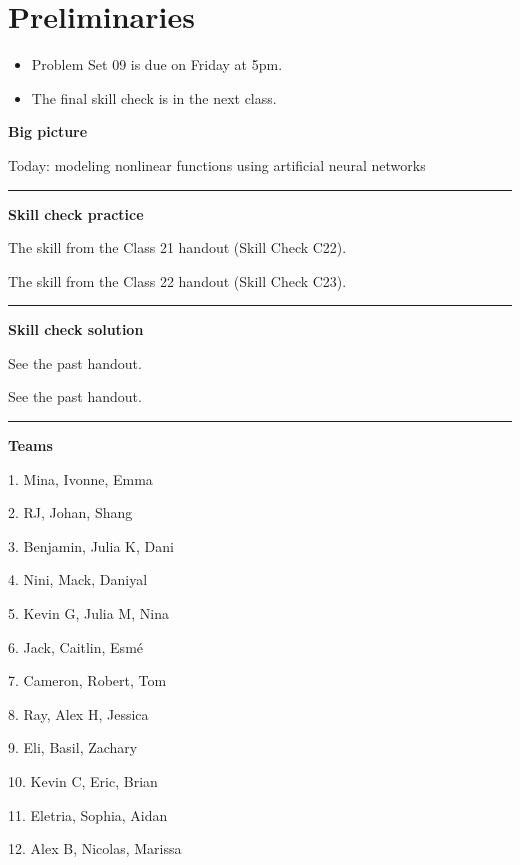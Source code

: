 \documentclass[12pt,letterpaper,noanswers]{exam}
\begin{document}
 \pdfpageheight 11in 
  \pdfpagewidth 8.5in

\noindent 

\section*{Preliminaries}


\begin{itemize}
\itemsep0pt
\item Problem Set 09 is due on Friday at 5pm.
\item The final skill check is in the next class.
\end{itemize}


\noindent\textbf{Big picture}

Today: modeling nonlinear functions using artificial neural networks

\vspace{0.2cm}
\hrule
\vspace{0.2cm}

\noindent \textbf{Skill check practice}
\begin{questions}


\item The skill from the Class 21 handout (Skill Check C22).

\item The skill from the Class 22 handout (Skill Check C23).
\end{questions}


\vspace{0.2cm}
\hrule
\vspace{0.2cm}

\noindent \textbf{Skill check solution}
\begin{questions}
\item See the past handout.

\item See the past handout.
\end{questions}
\vspace{0.2cm}
\hrule
\vspace{0.2cm}

\noindent \textbf{Teams}
\begin{multicols}{3}
1. Mina, Ivonne, Emma

2.  RJ, Johan, Shang

3. Benjamin, Julia K, Dani

4. Nini, Mack, Daniyal

5. Kevin G, Julia M, Nina

6. Jack, Caitlin, Esmé

7. Cameron, Robert, Tom

8. Ray, Alex H, Jessica

9. Eli, Basil, Zachary

10.  Kevin C, Eric, Brian

11. Eletria, Sophia, Aidan

12. Alex B, Nicolas, Marissa

\end{multicols}
\end{document}
